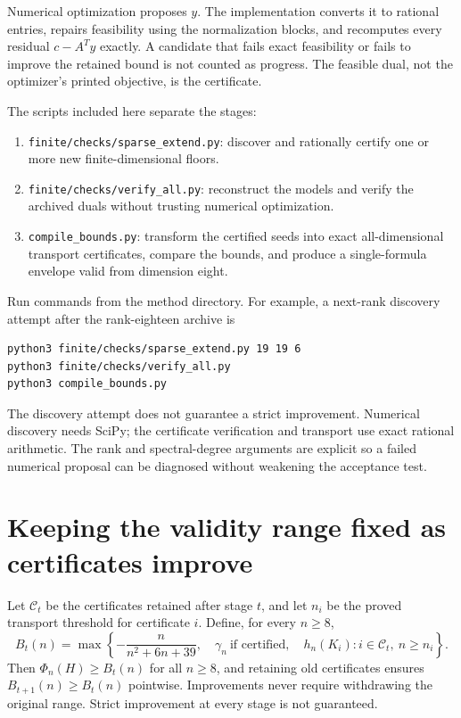 \documentclass[11pt]{article}
\begin{document}
Numerical optimization proposes $y$. The implementation converts it to
rational entries, repairs feasibility using the normalization blocks, and
recomputes every residual $c-A^Ty$ exactly. A candidate that fails exact
feasibility or fails to improve the retained bound is not counted as progress.
The feasible dual, not the optimizer's printed objective, is the certificate.

The scripts included here separate the stages:
\begin{enumerate}
\item \texttt{finite/checks/sparse\_extend.py}: discover and rationally certify
one or more new finite-dimensional floors.
\item \texttt{finite/checks/verify\_all.py}: reconstruct the models and verify
the archived duals without trusting numerical optimization.
\item \texttt{compile\_bounds.py}: transform the certified seeds into exact
all-dimensional transport certificates, compare the bounds, and produce a
single-formula envelope valid from dimension eight.
\end{enumerate}
Run commands from the method directory. For example, a next-rank discovery attempt after
the rank-eighteen archive is
\begin{verbatim}
python3 finite/checks/sparse_extend.py 19 19 6
python3 finite/checks/verify_all.py
python3 compile_bounds.py
\end{verbatim}
The discovery attempt does not guarantee a strict improvement. Numerical
discovery needs SciPy; the certificate verification and transport
use exact rational arithmetic. The rank and spectral-degree arguments are
explicit so a failed numerical proposal can be diagnosed without weakening
the acceptance test.

\section{Keeping the validity range fixed as certificates improve}
Let $\mathcal C_t$ be the certificates retained after stage $t$, and let $n_i$
be the proved transport threshold for certificate $i$. Define, for every
$n\ge8$,
\[
 B_t(n)=\max\left\{-\frac{n}{n^2+6n+39},\quad
 \gamma_n\ \text{if certified},\quad
 h_n(K_i):i\in\mathcal C_t,\ n\ge n_i\right\}.
\]
Then $\Phi_n(H)\ge B_t(n)$ for all $n\ge8$, and retaining old certificates
ensures $B_{t+1}(n)\ge B_t(n)$ pointwise. Improvements never require withdrawing
the original range. Strict improvement at every stage is not guaranteed.
\end{document}

